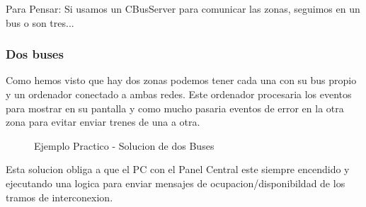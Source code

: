 \begin{mdframed}
Para Pensar: Si usamos un CBusServer para comunicar las zonas, seguimos en un bus o son tres... 
\end{mdframed}

\subsubsection{Dos buses}
Como hemos visto que hay dos zonas podemos tener cada una con su bus propio y un ordenador conectado a ambas redes. Este ordenador procesaria los eventos para mostrar en su pantalla y como mucho pasaria eventos de error en la otra zona para evitar enviar trenes de una a otra.


\begin{figure}[H]
    \centering

    \caption{Ejemplo Practico - Solucion de dos Buses}
    \label{fig:ejPracticoSolDosBuses}
\end{figure}

Esta solucion obliga a que el PC con el Panel Central este siempre encendido y ejecutando una logica para enviar mensajes de ocupacion/disponibildad de los tramos de interconexion.
